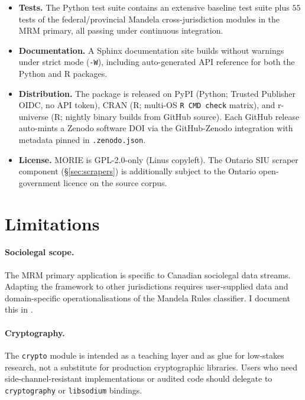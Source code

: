 \documentclass[11pt,a4paper]{article}
\theoremstyle{plain}
\theoremstyle{definition}
\theoremstyle{remark}
\begin{document}
\begin{itemize}
\item \textbf{Tests.} The Python test suite contains
      an extensive baseline test suite plus $55$ tests of the
      federal/provincial Mandela cross-jurisdiction modules in the
      MRM primary, all passing under continuous integration.
\item \textbf{Documentation.} A Sphinx documentation site builds
      without warnings under strict mode (\verb|-W|), including
      auto-generated API reference for both the Python and R
      packages.
\item \textbf{Distribution.} The package is released on PyPI
      (Python; Trusted Publisher OIDC, no API token), CRAN (R;
      multi-OS \texttt{R CMD check} matrix), and r-universe
      (R; nightly binary builds from GitHub source). Each
      GitHub release auto-mints a Zenodo software DOI via the
      GitHub-Zenodo integration with metadata pinned in
      \texttt{.zenodo.json}.
\item \textbf{License.} MORIE is GPL-2.0-only (Linus copyleft).
      The Ontario SIU scraper component (\S\ref{sec:scrapers}) is
      additionally subject to the Ontario open-government licence
      on the source corpus.
\end{itemize}

\section{Limitations}

\paragraph{Sociolegal scope.} The MRM primary application is
specific to Canadian sociolegal data streams. Adapting the
framework to other jurisdictions requires user-supplied data and
domain-specific operationalisations of the Mandela Rules
classifier. I document this in \cite{Ruhela2026MRM}.

\paragraph{Cryptography.} The \texttt{crypto} module is intended
as a teaching layer and as glue for low-stakes research, not a
substitute for production cryptographic libraries. Users who need
side-channel-resistant implementations or audited code should
delegate to \texttt{cryptography} or \texttt{libsodium} bindings.
\end{document}
